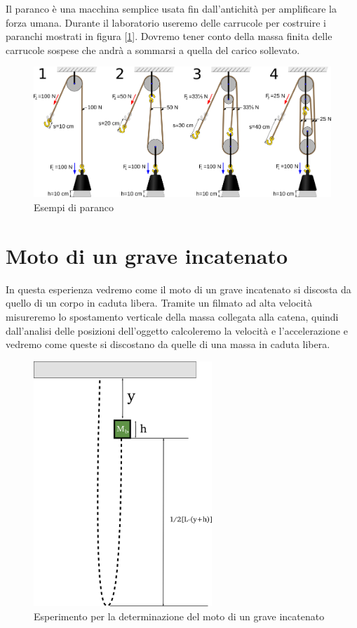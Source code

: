 \documentclass[a4paper,10pt,oneside]{article}
\begin{document}
Il paranco è una macchina semplice usata fin dall'antichità per amplificare la forza umana. Durante il laboratorio useremo delle carrucole per costruire i paranchi mostrati in figura [\ref{fig:paranco}]. Dovremo tener conto della massa finita delle carrucole sospese che andrà a sommarsi a quella del carico sollevato.
\begin{figure}[H]
 \centering
 \includegraphics[width=\textwidth]{./Immagini/Four_pulleys.png}
 \caption{Esempi di paranco}
 \label{fig:paranco}
\end{figure}



\section{Moto di un grave incatenato}

In questa esperienza vedremo come il moto di un grave incatenato si discosta da quello di un corpo in caduta libera. Tramite un filmato ad alta velocità misureremo lo spostamento verticale della massa collegata alla catena, quindi dall'analisi delle posizioni dell'oggetto calcoleremo la velocità e l'accelerazione e vedremo come queste si discostano da quelle di una massa in caduta libera.
\begin{figure}[H]
 \centering
 \includegraphics[width=0.6\textwidth]{./Immagini/bungiie.png}
 \caption{Esperimento per la determinazione del moto di un grave incatenato}
 \label{fig:moto_incatenato}
\end{figure}
\end{document}
